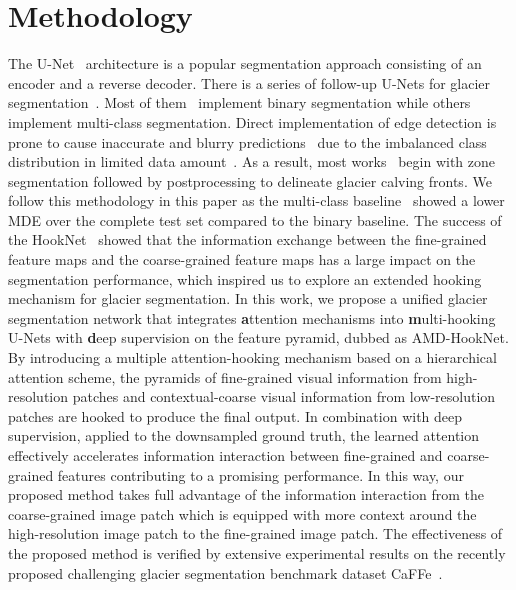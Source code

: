 \documentclass[lettersize,journal,siunitx]{IEEEtran}
\begin{document}
\section{Methodology}\label{sec:methodology}
The U-Net~\cite{ronneberger2015u} architecture is a popular segmentation approach consisting of an encoder and a reverse decoder. There is a series of follow-up U-Nets for glacier segmentation~\cite{baumhoer2019automated,heidler2021hed,holzmann2021glacier,mohajerani2019detection,liu2021multiscale,zhang2019automatically,periyasamy2022get,essd-14-4287-2022}. Most of them~\cite{baumhoer2019automated,mohajerani2019detection,heidler2021hed,holzmann2021glacier,zhang2019automatically,periyasamy2022get,cheng2021calving,essd-14-4287-2022} implement binary segmentation while others~\cite{marochov2021image,essd-14-4287-2022} implement multi-class segmentation. Direct implementation of edge detection is prone to cause inaccurate and blurry predictions~\cite{heidler2021hed} due to the imbalanced class distribution in limited data amount~\cite{fidon2017generalised}. As a result, most works~\cite{baumhoer2019automated,periyasamy2022get,holzmann2021glacier,mohajerani2019detection,liu2021multiscale,zhang2019automatically} begin with zone segmentation followed by postprocessing to delineate glacier calving fronts. We follow this methodology in this paper as the multi-class baseline~\cite{essd-14-4287-2022} showed a lower MDE over the complete test set compared to the binary baseline. The success of the HookNet~\cite{van2021hooknet} showed that the information exchange between the fine-grained feature maps and the coarse-grained feature maps has a large impact on the segmentation performance, which inspired us to explore an extended hooking mechanism for glacier segmentation. In this work, we propose a unified glacier segmentation network that integrates \textbf{a}ttention mechanisms into \textbf{m}ulti-hooking U-Nets with \textbf{d}eep supervision on the feature pyramid, dubbed as AMD-HookNet. By introducing a multiple attention-hooking mechanism based on a hierarchical attention scheme, the pyramids of fine-grained visual information from high-resolution patches and contextual-coarse visual information from low-resolution patches are hooked to produce the final output. In combination with deep supervision, applied to the downsampled ground truth, the learned attention effectively accelerates information interaction between fine-grained and coarse-grained features contributing to a promising performance. In this way, our proposed method takes full advantage of the information interaction from the coarse-grained image patch which is equipped with more context around the high-resolution image patch to the fine-grained image patch. The effectiveness of the proposed method is verified by extensive experimental results on the recently proposed challenging glacier segmentation benchmark dataset CaFFe~\cite{essd-14-4287-2022}.
\end{document}
